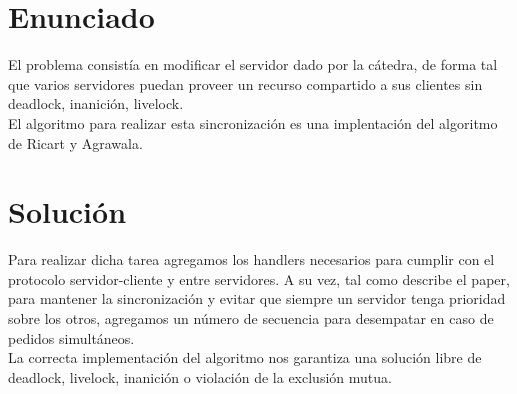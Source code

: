 \section{Enunciado}

El problema consistía en modificar el servidor dado por la cátedra, de forma tal que varios servidores puedan proveer un recurso compartido a sus clientes
sin deadlock, inanición, livelock.\\
El algoritmo para realizar esta sincronización es una implentación del algoritmo de Ricart y Agrawala.

\section{Solución}

Para realizar dicha tarea agregamos los handlers necesarios para cumplir con el protocolo servidor-cliente y entre servidores.
A su vez, tal como describe el paper, para mantener la sincronización y evitar que siempre un servidor tenga prioridad sobre los otros, agregamos
un número de secuencia para desempatar en caso de pedidos simultáneos.\\
La correcta implementación del algoritmo nos garantiza una solución libre de deadlock, livelock,
inanición o violación de la exclusión mutua.


